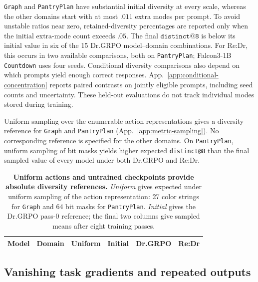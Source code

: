 \texttt{Graph} and \texttt{PantryPlan} have substantial initial diversity at every
scale, whereas the other domains start with at most $.011$ extra modes per
prompt. To avoid unstable ratios near zero, retained-diversity percentages
are reported only when the initial extra-mode count exceeds $.05$.
The final $\texttt{distinct@8}$ is below its initial value in six of the
15 Dr.GRPO model--domain combinations. For Re:Dr, this occurs in two
available comparisons, both on \texttt{PantryPlan}; Falcon3-1B
\texttt{Countdown} uses four seeds. Conditional diversity comparisons
also depend on which prompts yield enough correct responses.
App.~\ref{app:conditional-concentration} reports paired contrasts on
jointly eligible prompts, including seed counts and uncertainty. These
held-out evaluations do not track individual modes stored during training.

Uniform sampling over the enumerable action representations gives a
diversity reference for \texttt{Graph} and \texttt{PantryPlan}
(App.~\ref{app:metric-sampling}). No corresponding reference is specified
for the other domains. On \texttt{PantryPlan}, uniform sampling of bit
masks yields higher expected \texttt{distinct@8} than the final sampled
value of every model under both Dr.GRPO and Re:Dr.

\begin{table}[t]
  \centering
  \caption{\textbf{Uniform actions and untrained checkpoints provide absolute diversity references.}
  \emph{Uniform} gives expected \distk{} under uniform sampling of the
  action representation: 27 color strings for \texttt{Graph} and 64 bit masks
  for \texttt{PantryPlan}. \emph{Initial} gives the Dr.GRPO pass-0 reference;
  the final two columns give sampled means after eight training passes.}
  \label{tab:absolute-support-references}
  \scriptsize
  \setlength{\tabcolsep}{4.2pt}
  \begin{tabular}{@{}llrrrr@{}}
    \toprule
    \textbf{Model} & \textbf{Domain} & \textbf{Uniform} & \textbf{Initial}
      & \textbf{Dr.GRPO} & \textbf{Re:Dr} \\
    \midrule
    
  \end{tabular}
\end{table}


\subsection{Vanishing task gradients and repeated outputs}
\label{app:degenerate-groups}

